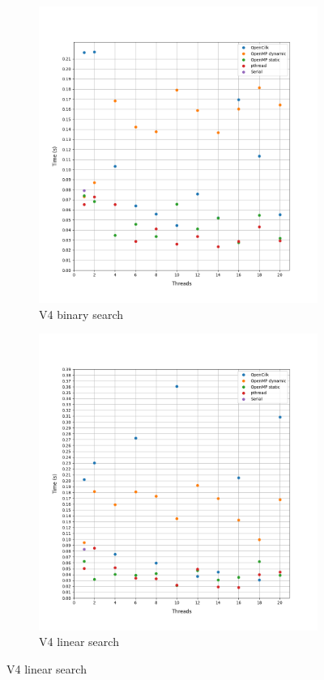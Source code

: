 \documentclass[12pt, a4paper]{article}
\begin{document}
\begin{figure}[h!]
\begin{subfigure}[b]{0.33\textwidth}
         \includegraphics[height=.4\textheight, width=\textwidth, keepaspectratio]{assets/belgium/v4_binary.png}
         \caption{V4 binary search}
     \end{subfigure}
     \begin{subfigure}[b]{0.33\textwidth}
         \centering
         \includegraphics[height=.4\textheight, width=\textwidth, keepaspectratio]{assets/belgium/v4_linear.png}
         \caption{V4 linear search} 
     \end{subfigure}
\end{figure}
\end{document}
